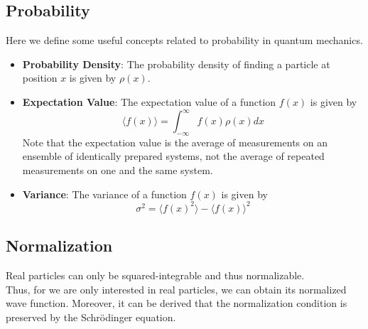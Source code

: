 \documentclass[a4paper,12pt]{article}
\begin{document}
\subsection{Probability}
Here we define some useful concepts related to probability in quantum mechanics.
\begin{itemize}
    \item \textbf{Probability Density}: The probability density of finding a particle at position $x$ is given by $\rho(x)$.
    \item \textbf{Expectation Value}: The expectation value of a function $f(x)$ is given by $$\langle f(x) \rangle = \int_{-\infty}^{\infty} f(x) \rho(x) dx$$
    Note that the expectation value is the average of measurements on an ensemble of identically prepared systems, not the average of repeated measurements on one and the same system.
    \item \textbf{Variance}: The variance of a function $f(x)$ is given by $$\sigma^2 = \langle f(x)^2 \rangle - \langle f(x) \rangle^2$$
\end{itemize}
\subsection{Normalization}
Real particles can only be squared-integrable and thus normalizable.\\
Thus, for we are only interested in real particles, we can obtain its normalized wave function. Moreover, it can be derived that the normalization condition is preserved by the Schr\"odinger equation.
\end{document}

